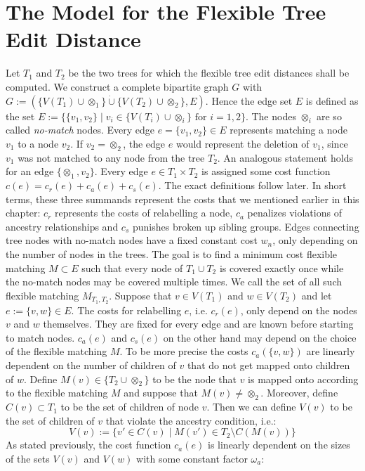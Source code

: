 \section{The Model for the Flexible Tree Edit Distance}
Let $T_1$ and $T_2$ be the two trees for which the flexible tree edit distances shall be computed. We construct a complete bipartite graph $G$ with\\
$G := (\{V(T_1)\cup \otimes_1\} \dot{\cup} \{V(T_2)\cup \otimes_2\}, E)$. Hence the edge set $E$ is defined as the set $E:=\{\{v_1,v_2\} \;|\; v_i \in\{V(T_i)\cup \otimes_i\}\text{ for }i =1,2\}$. The nodes $\otimes_i$ are so called \textit{no-match} nodes. Every edge $e=\{v_1,v_2\}\in E$ represents matching a node $v_1$ to a node $v_2$. If $v_2=\otimes_2$, the edge $e$ would represent the deletion of $v_1$, since $v_1$ was not matched to any node from the tree $T_2$. An analogous statement holds for an edge $\{\otimes_1,v_2\}$. Every edge $e \in T_1 \times T_2$ is assigned some cost function $c(e) = c_r(e) + c_a(e) + c_s(e)$. The exact definitions follow later. In short terms, these three summands represent the costs that we mentioned earlier in this chapter: $c_r$ represents the costs of relabelling a node, $c_a$ penalizes violations of ancestry relationships and $c_s$ punishes broken up sibling groups. Edges connecting tree nodes with no-match nodes have a fixed constant cost $w_n$, only depending on the number of nodes in the trees. The goal is to find a minimum cost flexible matching $M \subset E$ such that every node of $T_1 \cup T_2$ is covered exactly once while the no-match nodes may be covered multiple times. We call the set of all such flexible matching $M_{T_1, T_2}$.
Suppose that $v \in V(T_1)$ and $w \in V(T_2)$ and let $e:=\{v,w\}\in E$. The costs for relabelling $e$, i.e. $c_r(e)$, only depend on the nodes $v$ and $w$ themselves. They are fixed for every edge and are known before starting to match nodes. $c_a(e)$ and $c_s(e)$ on the other hand may depend on the choice of the flexible matching $M$. To be more precise the costs $c_a(\{v,w\})$ are linearly dependent on the number of children of $v$ that do not get mapped onto children of $w$. Define $M(v)\in \{T_2\cup\otimes_2\}$ to be the node that $v$ is mapped onto according to the flexible matching $M$ and suppose that $M(v) \neq \otimes_2$. Moreover, define $C(v) \subset T_1$ to be the set of children of node $v$. Then we can define $V(v)$ to be the set of children of $v$ that violate the ancestry condition, i.e.:
$$V(v) := \{v' \in C(v)\;|\;M(v') \in T_2 \setminus C(M(v))\}$$
As stated previously, the cost function $c_a(e)$ is linearly dependent on the sizes of the sets $V(v)$ and $V(w)$ with some constant factor $\omega_a$:

